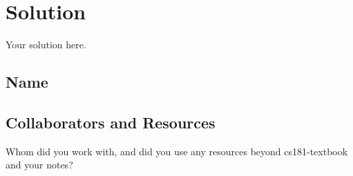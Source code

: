\documentclass[submit]{harvardml}
\newenvironment{solution}
  {\color{blue}\section*{Solution}}
{}
\begin{document}
\begin{solution}
	Your solution here.
\end{solution}

\newpage
\newpage
\subsection*{Name}
\subsection*{Collaborators and Resources}
Whom did you work with, and did you use any resources beyond cs181-textbook and your notes?
\end{document}
